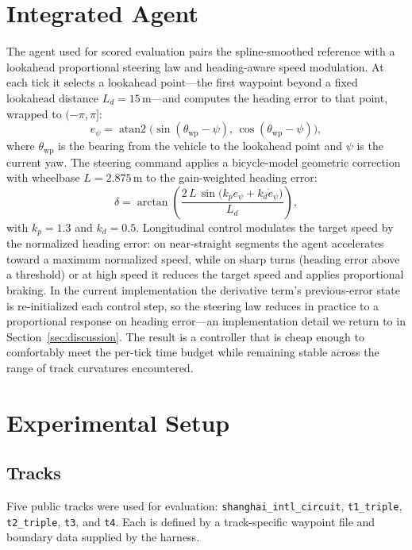 \documentclass[conference]{IEEEtran}
\begin{document}
\section{Integrated Agent}
\label{sec:integrated}

The agent used for scored evaluation pairs the spline-smoothed reference with a
lookahead proportional steering law and heading-aware speed modulation. At each
tick it selects a lookahead point---the first waypoint beyond a fixed lookahead
distance $L_d = 15\,\text{m}$---and computes the heading error to that point,
wrapped to $(-\pi, \pi]$:
\begin{equation}
e_\psi = \operatorname{atan2}\!\big(\sin(\theta_{\text{wp}} - \psi),\,
                                    \cos(\theta_{\text{wp}} - \psi)\big),
\end{equation}
where $\theta_{\text{wp}}$ is the bearing from the vehicle to the lookahead
point and $\psi$ is the current yaw. The steering command applies a
bicycle-model geometric correction with wheelbase $L = 2.875\,\text{m}$ to the
gain-weighted heading error:
\begin{equation}
\delta = \arctan\!\left(
  \frac{2\,L\,\sin\!\big(k_p e_\psi + k_d \dot{e}_\psi\big)}{L_d}
\right),
\end{equation}
with $k_p = 1.3$ and $k_d = 0.5$. Longitudinal control modulates the target
speed by the normalized heading error: on near-straight segments the agent
accelerates toward a maximum normalized speed, while on sharp turns (heading
error above a threshold) or at high speed it reduces the target speed and
applies proportional braking. In the current implementation the derivative
term's previous-error state is re-initialized each control step, so the steering
law reduces in practice to a proportional response on heading error---an
implementation detail we return to in Section~\ref{sec:discussion}. The result
is a controller that is cheap enough to comfortably meet the per-tick time
budget while remaining stable across the range of track curvatures encountered.

\section{Experimental Setup}

\subsection{Tracks}
Five public tracks were used for evaluation: \texttt{shanghai\_intl\_circuit},
\texttt{t1\_triple}, \texttt{t2\_triple}, \texttt{t3}, and \texttt{t4}. Each is
defined by a track-specific waypoint file and boundary data supplied by the
harness.
\end{document}
